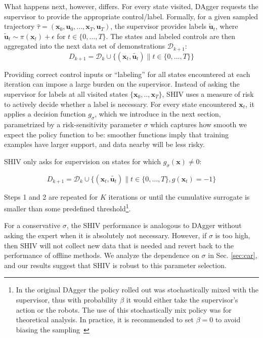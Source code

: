 \documentclass[10pt, conference]{ieeeconf}      %
\newcommand{\bu}{\mathbf{u}}
\newcommand{\bx}{\mathbf{x}}
\newcommand{\fpnote}[1]{\ifthenelse{ \boolean{include-notes}}%
 {\textcolor{blue}{\textbf{FP: #1}}}{}}
\begin{document}
What happens next, however, differs. For every state visited, DAgger requests the supervisor to provide the appropriate control/label. Formally, for a given sampled trajectory  $\hat{\tau} = (\bx_0,\bu_0,...,\bx_T,\bu_T )$, the supervisor provides labels $\tilde{\bu}_t$, where $\tilde{\bu}_t \sim \pi(\bx_t) + \epsilon$ for $t\in \{0, \ldots, T\}$.
The states and labeled controls are then aggregated into the next data set of demonstrations $\mathcal{D}_{k+1}$:
$$D_{k+1}=\mathcal{D}_k \cup \{(\bx_t,\tilde{\bu_t})\|t\in\{0,\ldots,T\}\} $$

Providing correct control inputs or ``labeling'' for all states encountered at each
iteration can impose a large burden on the supervisor.
Instead of asking the supervisor for labels at all visited states $\{\bx_0,..,\bx_T\}$, SHIV uses a measure of risk to actively decide whether a label is necessary. For every state encountered $\bx_t$, it applies a decision function $g_{\sigma}$, which we introduce in the next section, parametrized by a risk-sensitivity parameter $\sigma$ which captures how smooth we expect the policy function to be: smoother functions imply that training examples have larger support, and data nearby will be less risky.

SHIV only asks for supervision on states for which $g_{\sigma}(\bx) \neq 0$: 


$$D_{k+1}=\mathcal{D}_k \cup \{(\bx_t,\tilde{\bu_t})\|t\in\{0,\ldots,T\},g(\bx_t)=-1\}$$

Steps 1 and 2 are repeated for $K$ iterations or until 
the cumulative surrogate is smaller than some predefined threshold\footnote{In the original DAgger the policy rolled out
was stochastically mixed with the supervisor, thus with probability $\beta$ it would either take the supervisor's action
or the robots. The use of this stochastically mix policy was for theoretical analysis. In practice, it is recommended
to set $\beta = 0$ to avoid biasing the sampling~\cite{NIPS2014_5421,ross2010reduction}}.


 For a conservative $\sigma$, the SHIV performance is analogous to DAgger without asking the expert when it is absolutely not necessary. However, if $\sigma$ is too high, then SHIV will not collect new data that is needed and revert back to the performance of offline methods. We analyze the dependence on $\sigma$ in Sec. \ref{sec:car}, and our results suggest that SHIV is robust to this parameter selection. 
\end{document}

